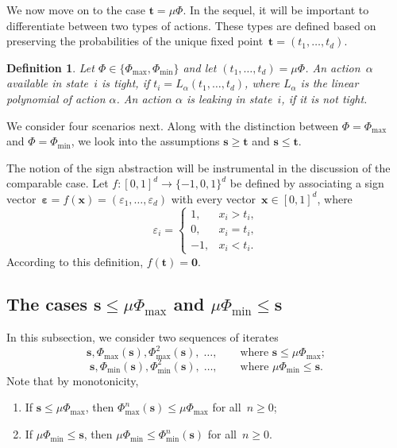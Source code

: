 \documentclass[preprint,12pt]{elsarticle}
\theoremstyle{plain}
\newtheorem{definition}[theorem]{Definition}
\theoremstyle{definition}
\theoremstyle{remark}
\theoremstyle{claimstyle}
\newcommand{\eps}{\bm{\varepsilon}}
\begin{document}
We now move on to the case $\bm{t} = \mu\Phi$.
In the sequel, it will be important to differentiate between two types of actions. These types are defined based on preserving the probabilities of the unique fixed point~$\bm{t} = (t_1, \dots, t_d)$.

\begin{definition}
Let $\Phi \in \{\Phi_{\max},\Phi_{\min}\}$ and let $(t_1, \dots, t_d) = \mu\Phi$. 
An action~$\alpha$ available in state~$i$ is \emph{tight}, if $t_i = L_\alpha(t_1, \dots, t_d)$, where $L_\alpha$ is the linear polynomial of action $\alpha$.
An action $\alpha$ is \emph{leaking} in state~$i$, if it is not tight.
\end{definition}

We consider four scenarios next. Along with the distinction between $\Phi= \Phi_{\max}$ and $\Phi=\Phi_{\min}$, we look into the assumptions $\bm{s} \geq \bm{t}$ and $\bm{s} \leq \bm{t}$.


The notion of the sign abstraction will be instrumental in the discussion of the comparable case.
Let $f:[0,1]^d \rightarrow \{-1,0,1\}^d$ be defined by associating 
a sign vector~$\eps = f(\bm{x}) = (\varepsilon_1, \dots, \varepsilon_d)$ 
with every vector~$\bm{x} \in [0,1]^d$, where 
\[\varepsilon_i = \begin{cases}
	1, & x_i > t_i,\\
	0, & x_i = t_i,\\
	-1, & x_i < t_i.
\end{cases}\]
According to this definition, $f(\bm{t}) = \bm{0}$.

\subsection{The cases $\bm{s} \leq \mu\Phi_{\max}$ and $\mu\Phi_{\min} \leq \bm{s} $} \label{sec:below}
In this subsection, we consider two sequences of iterates
\begin{equation}
	\label{max-below}
	\bm{s}, \Phi_{\max}(\bm{s}), \Phi^2_{\max}(\bm{s}), \; \dots, \qquad
	\text{where } \bm{s} \leq \mu\Phi_{\max};
\end{equation}
\begin{equation}
	\label{min-above}
	\bm{s}, \Phi_{\min}(\bm{s}), \Phi^2_{\min}(\bm{s}), \; \dots, \qquad 
	\text{where } \mu\Phi_{\min} \leq \bm{s}.
\end{equation}
Note that by monotonicity,
\begin{enumerate}
	\item If $\bm{s} \leq \mu\Phi_{\max}$, then $\Phi^n_{\max}(\bm{s}) \leq \mu\Phi_{\max}$ for all~$n \geq 0$;
	\item If $\mu\Phi_{\min} \leq \bm{s}$, then $\mu\Phi_{\min} \leq \Phi^n_{\min}(\bm{s})$ for all~$n \geq 0$.
\end{enumerate}
\end{document}
